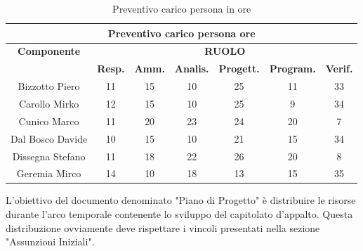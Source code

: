 \begin{table}[!h]
	\begin{center}
		  \begin{tabular}
			  {|c|c|c|c|c|c|c|}
		 \hline
			\multicolumn{7}{|c|}{ \textbf{Preventivo carico persona ore} } \\
			\hline
			\textbf{Componente} & \multicolumn{6}{|c|}{ \textbf{RUOLO} } \\
			\hline
			& \textbf{Resp.} & \textbf{Amm.} & \textbf{Analis.} & \textbf{Progett.} & \textbf{Program.} & \textbf{Verif.} \\
			\hline
			Bizzotto Piero &  11   &  15 &  10   &   25  &  11   &  33   \\ %
			\hline
			Carollo Mirko &  12   &  15  &  10  &  25   &  9   &  34   \\ %
			\hline
			Cunico Marco    &  11   &  20  &  23   &  24   &  20   &  7   \\ %
			\hline
			Dal Bosco Davide        &  10   &  15   &  10   &  21   &   15  &  34  \\ %
			\hline
			Dissegna Stefano        &  11  &  18   & 22  &  26   &  20  &  8  \\ %
			\hline
			Geremia Mirco   &   14  &  10   &  18   &  13  &  15   &  35   \\ %
			\hline		
		\end{tabular}
	\caption{Preventivo carico persona in ore} %
	\label{tab:TabellaPrevPersOre}
	\end{center}	
\end{table}

L'obiettivo del documento denominato "Piano di Progetto" \`e distribuire le risorse durante l'arco temporale 
contenente lo sviluppo del capitolato d'appalto. Questa distribuzione ovviamente deve rispettare i vincoli presentati 
nella sezione "Assunzioni Iniziali".

